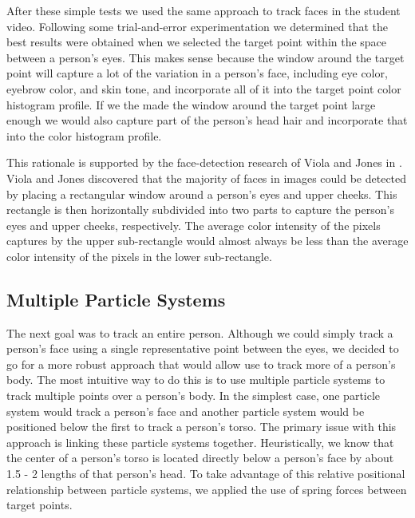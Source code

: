 \documentclass[12pt]{article}
\begin{document}
After these simple tests we used the same approach to track faces in the student video. Following some trial-and-error experimentation we determined that the best results were obtained when we selected the target point within the space between a person's eyes. This makes sense because the window around the target point will capture a lot of the variation in a person's face, including eye color, eyebrow color, and skin tone, and incorporate all of it into the target point color histogram profile. If we the made the window around the target point large enough we would also capture part of the person's head hair and incorporate that into the color histogram profile. 

This rationale is supported by the face-detection research of Viola and Jones in \cite{facedetection}. Viola and Jones discovered that the majority of faces in images could be detected by placing a rectangular window around a person's eyes and upper cheeks. This rectangle is then horizontally subdivided into two parts to capture the person's eyes and upper cheeks, respectively. The average color intensity of the pixels captures by the upper sub-rectangle would almost always be less than the average color intensity of the pixels in the lower sub-rectangle.  



\subsection{Multiple Particle Systems}
\label{multparticlesys}

The next goal was to track an entire person. Although we could simply track a person's face using a single representative point between the eyes, we decided to go for a more robust approach that would allow use to track more of a person's body. The most intuitive way to do this is to use multiple particle systems to track multiple points over a person's body. In the simplest case, one particle system would track a person's face and another particle system would be positioned below the first to track a person's torso. The primary issue with this approach is linking these particle systems together. Heuristically, we know that the center of a person's torso is located directly below a person's face by about 1.5 - 2 lengths of that person's head. To take advantage of this relative positional relationship between particle systems, we applied the use of spring forces between target points.
\end{document}
